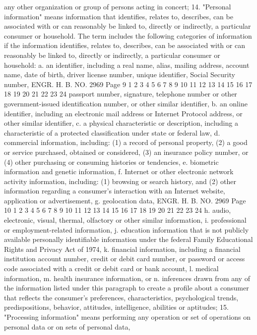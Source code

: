 any other organization or group of persons acting in concert;
14. "Personal information" means information that identifies,
relates to, describes, can be associated with or can reasonably be
linked to, directly or indirectly, a particular consumer or
household. The term includes the following categories of
information if the information identifies, relates to, describes,
can be associated with or can reasonably be linked to, directly or
indirectly, a particular consumer or household:
a. an identifier, including a real name, alias, mailing
address, account name, date of birth, driver license
number, unique identifier, Social Security number, 
ENGR. H. B. NO. 2969 Page 9
1
2
3
4
5
6
7
8
9
10
11
12
13
14
15
16
17
18
19
20
21
22
23
24
passport number, signature, telephone number or other
government-issued identification number, or other
similar identifier,
b. an online identifier, including an electronic mail
address or Internet Protocol address, or other similar
identifier,
c. a physical characteristic or description, including a
characteristic of a protected classification under
state or federal law,
d. commercial information, including:
(1) a record of personal property,
(2) a good or service purchased, obtained or
considered,
(3) an insurance policy number, or
(4) other purchasing or consuming histories or
tendencies,
e. biometric information and genetic information,
f. Internet or other electronic network activity
information, including:
(1) browsing or search history, and
(2) other information regarding a consumer's
interaction with an Internet website, application
or advertisement,
g. geolocation data,
ENGR. H. B. NO. 2969 Page 10
1
2
3
4
5
6
7
8
9
10
11
12
13
14
15
16
17
18
19
20
21
22
23
24
h. audio, electronic, visual, thermal, olfactory or other
similar information,
i. professional or employment-related information,
j. education information that is not publicly available
personally identifiable information under the federal
Family Educational Rights and Privacy Act of 1974,
k. financial information, including a financial
institution account number, credit or debit card
number, or password or access code associated with a
credit or debit card or bank account,
l. medical information,
m. health insurance information, or
n. inferences drawn from any of the information listed
under this paragraph to create a profile about a
consumer that reflects the consumer's preferences,
characteristics, psychological trends,
predispositions, behavior, attitudes, intelligence,
abilities or aptitudes;
15. "Processing information" means performing any operation or
set of operations on personal data or on sets of personal data,
